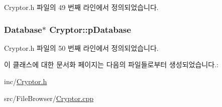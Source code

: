 Cryptor.\+h 파일의 49 번째 라인에서 정의되었습니다.

\hypertarget{class_cryptor_af995ba24eee0b7d4b12dbc1eaae049fd}{
\subsubsection[{p\+Database}]{\setlength{\rightskip}{0pt plus 5cm}Database$\ast$ Cryptor\+::p\+Database\hspace{0.3cm}{\ttfamily [private]}}}\label{class_cryptor_af995ba24eee0b7d4b12dbc1eaae049fd}


Cryptor.\+h 파일의 50 번째 라인에서 정의되었습니다.



이 클래스에 대한 문서화 페이지는 다음의 파일들로부터 생성되었습니다.\+:\begin{DoxyCompactItemize}
\item 
inc/\hyperlink{_cryptor_8h}{Cryptor.\+h}\item 
src/\+File\+Browser/\hyperlink{_cryptor_8cpp}{Cryptor.\+cpp}\end{DoxyCompactItemize}
